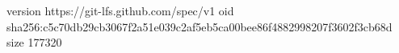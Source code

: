 version https://git-lfs.github.com/spec/v1
oid sha256:c5c70db29cb3067f2a51e039c2af5eb5ca00bee86f4882998207f3602f3cb68d
size 177320
